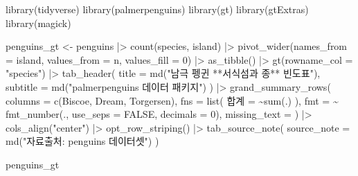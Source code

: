 \documentclass[
  letterpaper,
]{book}
\newenvironment{Shaded}{\begin{snugshade}}{\end{snugshade}}
\newcommand{\AttributeTok}[1]{\textcolor[rgb]{0.40,0.45,0.13}{#1}}
\newcommand{\ConstantTok}[1]{\textcolor[rgb]{0.56,0.35,0.01}{#1}}
\newcommand{\DecValTok}[1]{\textcolor[rgb]{0.68,0.00,0.00}{#1}}
\newcommand{\ErrorTok}[1]{\textcolor[rgb]{0.68,0.00,0.00}{#1}}
\newcommand{\FunctionTok}[1]{\textcolor[rgb]{0.28,0.35,0.67}{#1}}
\newcommand{\NormalTok}[1]{\textcolor[rgb]{0.00,0.23,0.31}{#1}}
\newcommand{\OtherTok}[1]{\textcolor[rgb]{0.00,0.23,0.31}{#1}}
\newcommand{\SpecialCharTok}[1]{\textcolor[rgb]{0.37,0.37,0.37}{#1}}
\newcommand{\StringTok}[1]{\textcolor[rgb]{0.13,0.47,0.30}{#1}}
\begin{document}
\begin{Shaded}
\begin{Highlighting}[]
\FunctionTok{library}\NormalTok{(tidyverse)}
\FunctionTok{library}\NormalTok{(palmerpenguins)}
\FunctionTok{library}\NormalTok{(gt)}
\FunctionTok{library}\NormalTok{(gtExtras)}
\FunctionTok{library}\NormalTok{(magick)}

\NormalTok{penguins\_gt }\OtherTok{\textless{}{-}}\NormalTok{ penguins }\SpecialCharTok{|\textgreater{}} 
  \FunctionTok{count}\NormalTok{(species, island) }\SpecialCharTok{|\textgreater{}} 
  \FunctionTok{pivot\_wider}\NormalTok{(}\AttributeTok{names\_from =}\NormalTok{ island, }\AttributeTok{values\_from =}\NormalTok{ n, }\AttributeTok{values\_fill =} \DecValTok{0}\NormalTok{) }\SpecialCharTok{|\textgreater{}} 
  \FunctionTok{as\_tibble}\NormalTok{() }\SpecialCharTok{|\textgreater{}} 
  \FunctionTok{gt}\NormalTok{(}\AttributeTok{rowname\_col =} \StringTok{"species"}\NormalTok{) }\SpecialCharTok{|\textgreater{}} 
    \FunctionTok{tab\_header}\NormalTok{(}
      \AttributeTok{title =} \FunctionTok{md}\NormalTok{(}\StringTok{"남극 펭귄 **서식섬과 종** 빈도표"}\NormalTok{),}
      \AttributeTok{subtitle =} \FunctionTok{md}\NormalTok{(}\StringTok{"\textasciigrave{}palmerpenguins\textasciigrave{} 데이터 패키지"}\NormalTok{)}
\NormalTok{    ) }\SpecialCharTok{|\textgreater{}} 
    \FunctionTok{grand\_summary\_rows}\NormalTok{(}
      \AttributeTok{columns =} \FunctionTok{c}\NormalTok{(Biscoe, Dream, Torgersen),}
      \AttributeTok{fns =} \FunctionTok{list}\NormalTok{(}
        \StringTok{\textquotesingle{}합계\textquotesingle{}} \OtherTok{=} \ErrorTok{\textasciitilde{}}\FunctionTok{sum}\NormalTok{(.) }
\NormalTok{      ),}
      \AttributeTok{fmt =} \SpecialCharTok{\textasciitilde{}} \FunctionTok{fmt\_number}\NormalTok{(., }\AttributeTok{use\_seps =} \ConstantTok{FALSE}\NormalTok{, }\AttributeTok{decimals =} \DecValTok{0}\NormalTok{),}
      \AttributeTok{missing\_text =} \StringTok{\textquotesingle{}{-}\textquotesingle{}}
\NormalTok{    )  }\SpecialCharTok{|\textgreater{}} 
    \FunctionTok{cols\_align}\NormalTok{(}\StringTok{"center"}\NormalTok{) }\SpecialCharTok{|\textgreater{}} 
    \FunctionTok{opt\_row\_striping}\NormalTok{() }\SpecialCharTok{|\textgreater{}} 
    \FunctionTok{tab\_source\_note}\NormalTok{(}
      \AttributeTok{source\_note =} \FunctionTok{md}\NormalTok{(}\StringTok{"자료출처: \textasciigrave{}penguins\textasciigrave{} 데이터셋"}\NormalTok{)}
\NormalTok{  )}

\NormalTok{penguins\_gt}
\end{Highlighting}
\end{Shaded}
\end{document}
